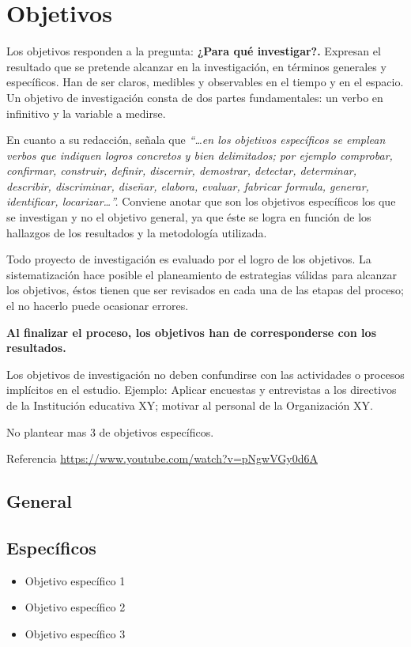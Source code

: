 \chapter{Objetivos}
\label{Objetivos}

Los objetivos responden a la pregunta: \textbf{¿Para qué investigar?.} Expresan el resultado que se pretende alcanzar en la investigación, en términos generales y específicos. Han de ser claros, medibles y observables en el tiempo y en el espacio. Un objetivo de investigación consta de dos partes fundamentales: un verbo en infinitivo y la variable a medirse.

En cuanto a su redacción, \cite{herrera2004tutoria} señala que \textit{ “…en los objetivos específicos se emplean verbos que indiquen logros concretos y bien delimitados; por ejemplo comprobar, confirmar, construir, definir, discernir, demostrar, detectar, determinar, describir, discriminar, diseñar, elabora, evaluar, fabricar formula, generar, identificar, locarizar…”.} Conviene anotar que son los objetivos específicos los que se investigan y no el objetivo general, ya que éste se logra en función de los hallazgos de los resultados y la metodología utilizada.

Todo proyecto de investigación es evaluado por el logro de los objetivos. La sistematización hace posible el planeamiento de estrategias válidas para alcanzar los objetivos, éstos tienen que ser revisados en cada una de las etapas del proceso; el no hacerlo puede ocasionar errores. 

\textbf{Al finalizar el proceso, los objetivos han de corresponderse con los resultados.}

Los objetivos de investigación no deben confundirse con las actividades o procesos 
implícitos en el estudio. Ejemplo: Aplicar encuestas y entrevistas a los directivos de la 
Institución educativa XY; motivar al personal de la Organización XY.

No plantear mas 3 de objetivos específicos.

Referencia \url{https://www.youtube.com/watch?v=pNgwVGy0d6A}

\section{General}

\section{Específicos}
\begin{itemize}
    \item Objetivo específico 1
    \item Objetivo específico 2
    \item Objetivo específico 3
\end{itemize}